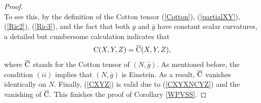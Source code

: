 \documentclass[10pt,leqno,oneside]{amsart}
\begin{document}
{\begin{proof}
\begin{equation}
          \end{equation}
          To see this, by the definition of the Cotton tensor (\ref{Cotton}), (\ref{partialXY}), (\ref{Ric2}), (\ref{Ric3}), and the fact that both $g$ and $\bar{g}$ have constant scalar curvatures, a detailed but cumbersome calculation indicates that
          \begin{equation}\label{CXYXNCYZ}
             {\rm{C}}(X,Y,Z)=\overline{{\rm{C}}}(X,Y,Z),
          \end{equation}
          where $\overline{{\rm{C}}}$ stands for the Cotton tensor of $(N , \bar{g}).$ As mentioned before, the condition $(ii)$ implies that $(N , \bar{g})$ is Einstein. As a result, $\overline{{\rm{C}}}$ vanishes identically on $N .$ Finally, (\ref{CXYZ}) is valid due to (\ref{CXYXNCYZ}) and the vanishing of $\overline{{\rm{C}}}.$
          This finishes the proof of Corollary \ref{WPVSS}.
    \end{proof}

}
\end{document}
